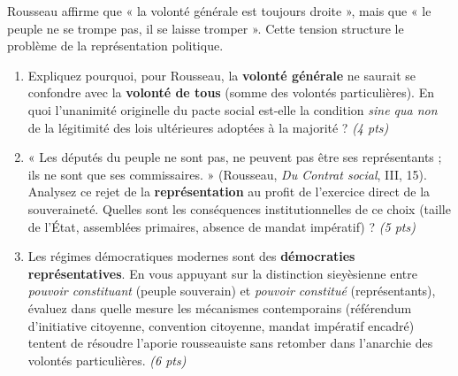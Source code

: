 \documentclass[11pt]{article}
\begin{document}
\begin{exercice}
Rousseau affirme que « la volonté générale est toujours droite », mais que « le peuple ne se trompe pas, il se laisse tromper ». Cette tension structure le problème de la représentation politique.

\begin{enumerate}
    \item Expliquez pourquoi, pour Rousseau, la \textbf{volonté générale} ne saurait se confondre avec la \textbf{volonté de tous} (somme des volontés particulières). En quoi l'unanimité originelle du pacte social est-elle la condition \textit{sine qua non} de la légitimité des lois ultérieures adoptées à la majorité ? \textit{(4 pts)}
    \item « Les députés du peuple ne sont pas, ne peuvent pas être ses représentants ; ils ne sont que ses commissaires. » (Rousseau, \textit{Du Contrat social}, III, 15). Analysez ce rejet de la \textbf{représentation} au profit de l'exercice direct de la souveraineté. Quelles sont les conséquences institutionnelles de ce choix (taille de l'État, assemblées primaires, absence de mandat impératif) ? \textit{(5 pts)}
    \item Les régimes démocratiques modernes sont des \textbf{démocraties représentatives}. En vous appuyant sur la distinction sieyèsienne entre \textit{pouvoir constituant} (peuple souverain) et \textit{pouvoir constitué} (représentants), évaluez dans quelle mesure les mécanismes contemporains (référendum d'initiative citoyenne, convention citoyenne, mandat impératif encadré) tentent de résoudre l'aporie rousseauiste sans retomber dans l'anarchie des volontés particulières. \textit{(6 pts)}
\end{enumerate}
\end{exercice}
\end{document}
